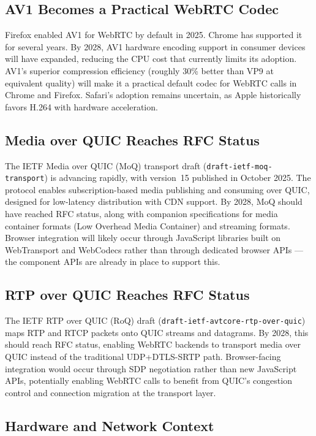 \documentclass[11pt]{article}
\begin{document}
\subsection{AV1 Becomes a Practical WebRTC Codec}

Firefox enabled AV1 for WebRTC by default in 2025. Chrome has supported it
for several years. By 2028, AV1 hardware encoding support in consumer devices
will have expanded, reducing the CPU cost that currently limits its adoption.
AV1's superior compression efficiency (roughly 30\% better than VP9 at
equivalent quality) will make it a practical default codec for WebRTC calls
in Chrome and Firefox. Safari's adoption remains uncertain, as Apple
historically favors H.264 with hardware acceleration.

\subsection{Media over QUIC Reaches RFC Status}

The IETF Media over QUIC (MoQ) transport draft
(\texttt{draft-ietf-moq-transport}) is advancing rapidly, with version~15
published in October 2025. The protocol enables subscription-based media
publishing and consuming over QUIC, designed for low-latency distribution
with CDN support. By 2028, MoQ should have reached RFC status, along with
companion specifications for media container formats (Low Overhead Media
Container) and streaming formats. Browser integration will likely occur
through JavaScript libraries built on WebTransport and WebCodecs rather than
through dedicated browser APIs --- the component APIs are already in place to
support this.

\subsection{RTP over QUIC Reaches RFC Status}

The IETF RTP over QUIC (RoQ) draft (\texttt{draft-ietf-avtcore-rtp-over-quic})
maps RTP and RTCP packets onto QUIC streams and datagrams. By 2028, this
should reach RFC status, enabling WebRTC backends to transport media over
QUIC instead of the traditional UDP+DTLS-SRTP path. Browser-facing
integration would occur through SDP negotiation rather than new JavaScript
APIs, potentially enabling WebRTC calls to benefit from QUIC's congestion
control and connection migration at the transport layer.

\subsection{Hardware and Network Context}
\end{document}
